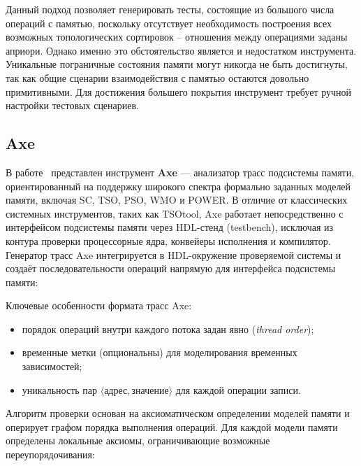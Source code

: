 Данный подход позволяет генерировать тесты, состоящие из большого
числа операций с памятью, поскольку отсутствует необходимость
построения всех возможных топологических сортировок -- отношения между
операциями заданы априори. Однако именно это обстоятельство является
и недостатком инструмента. Уникальные пограничные состояния памяти
могут никогда не быть достигнуты, так как общие сценарии
взаимодействия с памятью остаются довольно примитивными. Для
достижения большего покрытия инструмент требует ручной настройки
тестовых сценариев.

\subsection{Axe}
\label{sec:manovit-adv}

В работе~\cite{Axe} представлен инструмент \textbf{Axe} ---
анализатор трасс подсистемы памяти, ориентированный на поддержку
широкого спектра формально заданных моделей памяти, включая SC, TSO,
PSO, WMO и POWER. В отличие от классических системных инструментов,
таких как TSOtool, Axe работает непосредственно с
интерфейсом подсистемы памяти через HDL-стенд (testbench), исключая
из контура проверки процессорные ядра, конвейеры исполнения и
компилятор. Генератор трасс Axe интегрируется в HDL-окружение
проверяемой системы и создаёт последовательности операций напрямую
для интерфейса подсистемы памяти:

\begin{minipage}[ht]{\textwidth}
  \centering
  
\end{minipage}

Ключевые особенности формата трасс Axe:
\begin{itemize}
  \item порядок операций внутри каждого потока задан явно
    (\textit{thread order});
  \item временные метки (опциональны) для моделирования временных зависимостей;
  \item уникальность пар $\langle \text{адрес}, \text{значение}
    \rangle$ для каждой операции записи.
\end{itemize}

Алгоритм проверки основан на аксиоматическом определении моделей
памяти и оперирует графом порядка выполнения операций. Для каждой
модели памяти определены локальные аксиомы, ограничивающие возможные
переупорядочивания:

